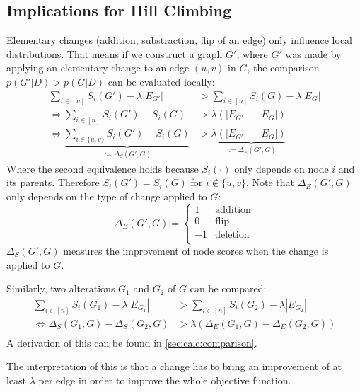 \documentclass[sigconf, fleqn]{acmart}
\newcommand{\set}[1]{\{#1\}}
\newcommand{\abs}[1]{\left\vert #1 \right\vert}
\begin{document}
\subsection{Implications for Hill Climbing}
Elementary changes (addition, substraction, flip of an edge) only influence local distributions.
That means if we construct a graph $G'$, where $G'$ was made by applying an elementary change to an edge $(u, v)$ in $G$, the comparison $p(G' | D) > p(G | D)$ can be evaluated locally:
\begin{align*}
	\sum\limits_{i \in [n]} S_i(G') - \lambda \abs{E_{G'}}                               & > \sum\limits_{i \in [n]} S_i(G) - \lambda \abs{E_{G}}                  \\
	\iff\sum\limits_{i \in [n]} S_i(G') - S_i(G)                                         & > \lambda (\abs{E_{G'}} - \abs{E_{G}})                                  \\
	\iff\underbrace{\sum\limits_{i \in \set{u,v}} S_i(G') - S_i(G)}_{:= \Delta_S(G', G)} & > \lambda \underbrace{(\abs{E_{G'}} - \abs{E_{G}})}_{:= \Delta_E(G',G)}
\end{align*}
Where the second equivalence holds because $S_i(\cdot)$ only depends on node $i$ and its parents.
Therefore $S_i(G') = S_i(G)$ for $i \notin \set{u, v}$.
Note that $\Delta_E(G',G)$ only depends on the type of change applied to $G$:
$$
	\Delta_E(G',G) = \begin{cases}
		1  & \text{addition} \\
		0  & \text{flip}     \\
		-1 & \text{deletion} \\
	\end{cases}
$$
$\Delta_S(G', G)$ measures the improvement of node scores when the change is applied to $G$.

Similarly, two alterations $G_1$ and $G_2$ of $G$ can be compared:
\begin{align*}
	\sum\limits_{i \in [n]} S_i(G_1) - \lambda \abs{E_{G_1}} & > \sum\limits_{i \in [n]} S_i(G_2) - \lambda \abs{E_{G_2}} \\
	\iff \Delta_S(G_1, G) - \Delta_S(G_2, G)                 & > \lambda \left(\Delta_E(G_1,G) - \Delta_E(G_2,G)\right)   \\
\end{align*}
A derivation of this can be found in \autoref{sec:calc:comparison}.

The interpretation of this is that a change has to bring an improvement of at least $\lambda$ per edge in order to improve the whole objective function.
\end{document}
